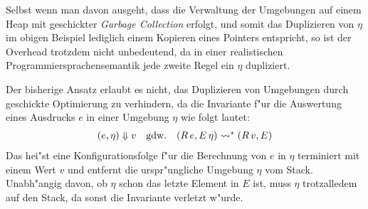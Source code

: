 \documentclass[12pt,a4paper,draft]{article}
\begin{document}
Selbst wenn man davon ausgeht, dass die Verwaltung der Umgebungen auf einem Heap mit geschickter \emph{Garbage
Collection} erfolgt, und somit das Duplizieren von $\eta$ im obigen Beispiel lediglich einem Kopieren eines
Pointers entspricht, so ist der Overhead trotzdem nicht unbedeutend, da in einer realistischen
Programmiersprachensemantik jede zweite Regel ein $\eta$ dupliziert.

Der bisherige Ansatz erlaubt es nicht, das Duplizieren von Umgebungen durch geschickte Optimierung zu
verhindern, da die Invariante f"ur die Auswertung eines Ausdrucks $e$ in einer Umgebung $\eta$ wie
folgt lautet:
\[\begin{array}{rcl}
  (e,\eta) \Downarrow v & \text{gdw.} & (R\,e,E\,\eta) \rightsquigarrow^* (R\,v,E)
\end{array}\]
Das hei"st eine Konfigurationsfolge f"ur die Berechnung von $e$ in $\eta$ terminiert mit einem Wert $v$
und entfernt die urspr"ungliche Umgebung $\eta$ vom Stack. Unabh"angig davon, ob $\eta$ schon das letzte
Element in $E$ ist, muss $\eta$ trotzalledem auf den Stack, da sonst die Invariante verletzt w"urde.
\end{document}
